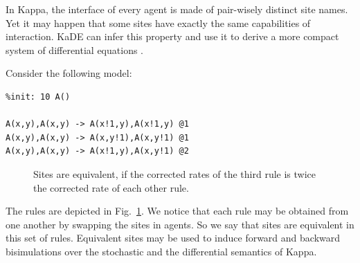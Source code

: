 \documentclass[11pt]{book}
\def\KaDE{\textsf{KaDE}}
\begin{document}
In Kappa, the interface of every agent is made of pair-wisely distinct site names. Yet it may happen that some sites have exactly the same capabilities of interaction. {\KaDE} can infer this property and use it to derive a more compact system of differential equations \cite{Feret-MFPSXXVII,CAMPORESI201073,Feret201545}.


Consider the following model:
\begin{lstlisting}[language=kappa]
%agent: A(x,y)
%init: 10 A()

A(x,y),A(x,y) -> A(x!1,y),A(x!1,y) @1
A(x,y),A(x,y) -> A(x,y!1),A(x,y!1) @1
A(x,y),A(x,y) -> A(x!1,y),A(x,y!1) @2
\end{lstlisting}

\begin{figure}[t]
  \begin{minipage}{0.3\linewidth}
    \centering{}
  \end{minipage}\hspace*{5mm}
  \begin{minipage}{0.3\linewidth}
  \end{minipage}\hspace*{5mm}
\begin{minipage}{0.3\linewidth}
    \centering{}
  \end{minipage}
  \caption{Sites are equivalent, if the corrected rates of the third rule is twice the corrected rate of each other rule.}
  \label{fig:symmetric:rules}
\end{figure}

The rules are depicted in Fig.~\ref{fig:symmetric:rules}. We notice that each rule may be obtained from one another by swapping the sites in agents.  So we say that sites are equivalent in this set of rules. Equivalent sites may be used to induce forward and backward bisimulations \cite{buchholz_bisimulation,Feret_IJSI2013,Feret-MFPSXXVII,CAMPORESI201073,Feret201545} over the stochastic and the differential semantics of Kappa.
\end{document}
